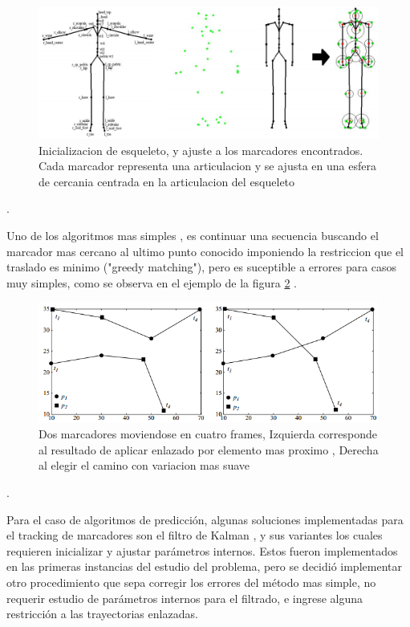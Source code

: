 \begin{figure}[hbt]
\begin{center}
\includegraphics[scale=0.5]{img/Tracking/01_skeleton_fitting_Herda.png}
\end{center}
\caption{Inicializacion de esqueleto, y ajuste a los marcadores encontrados. Cada marcador representa una articulacion y se ajusta en una esfera de cercania centrada en la articulacion del esqueleto}
\label{skeleton_fitting_herda}
\end{figure}.

Uno de los algoritmos mas simples \cite{survey_tracking}, es continuar una secuencia buscando el marcador mas cercano al ultimo punto conocido imponiendo la restriccion que el traslado es minimo ("greedy matching"), pero es suceptible a errores para casos muy simples, como se observa en el ejemplo de la figura \ref{greedy_matching} .

\begin{figure}[hbt]
\begin{center}
\includegraphics[scale=0.8]{img/Tracking/01_Greedy_Matching.png}
\end{center}
\caption{Dos marcadores moviendose en cuatro frames, Izquierda corresponde al resultado de aplicar enlazado por elemento mas proximo \cite{survey_tracking} , Derecha al elegir el camino con variacion mas suave}
\label{greedy_matching}
\end{figure}.

Para el caso de algoritmos de predicción, algunas soluciones implementadas para el tracking de marcadores son el filtro de Kalman \cite{kalman}, y sus variantes los cuales requieren inicializar y ajustar parámetros internos. Estos fueron implementados en las primeras instancias del estudio del problema, pero se decidió implementar otro procedimiento que sepa corregir los errores del método mas simple, no requerir estudio de parámetros internos para el filtrado, e ingrese alguna restricción a las trayectorias enlazadas.

